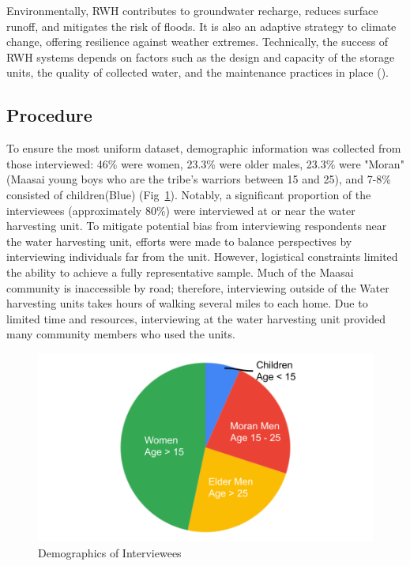 \documentclass[10pt, twocolumn]{article}
\begin{document}
Environmentally, RWH contributes to groundwater recharge, reduces surface runoff, and mitigates the risk of floods. It is also an adaptive strategy to climate change, offering resilience against weather extremes. Technically, the success of RWH systems depends on factors such as the design and capacity of the storage units, the quality of collected water, and the maintenance practices in place (\autocite{TZ_Water_Harvesting}).

\subsection{Procedure}

To ensure the most uniform dataset, demographic information was collected from those interviewed: 46\% were women, 23.3\% were older males, 23.3\% were "Moran" (Maasai young boys who are the tribe’s warriors between 15 and 25), and 7-8\% consisted of children(Blue) (Fig~\ref{fig:demographics}). Notably, a significant proportion of the interviewees (approximately 80\%) were interviewed at or near the water harvesting unit. To mitigate potential bias from interviewing respondents near the water harvesting unit, efforts were made to balance perspectives by interviewing individuals far from the unit. However, logistical constraints limited the ability to achieve a fully representative sample. Much of the Maasai community is inaccessible by road; therefore, interviewing outside of the Water harvesting units takes hours of walking several miles to each home. Due to limited time and resources, interviewing at the water harvesting unit provided many community members who used the units.

\begin{figure} [H]
    \centering
    \includegraphics[width=1\linewidth]{photos/demographic_split.png}
    \caption{Demographics of Interviewees}
    \label{fig:demographics}
\end{figure}
\end{document}
